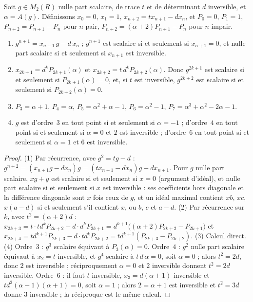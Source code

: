 \begin{enonce}
Soit $g \in M_2(R)$ nulle part scalaire, de trace $t$ et de déterminant $d$ inversible, et $\alpha = A(g)$. Définissons $x_0 = 0$, $x_1 = 1$, $x_{n+2} = t x_{n+1} - d x_n$, et $P_0 = 0$, $P_1 = 1$, $P_{n+2} = P_{n+1} - P_n$ pour $n$ pair, $P_{n+2} = (\alpha + 2)P_{n+1} - P_n$ pour $n$ impair.
\begin{enumerate}
\item $g^{n+1} = x_{n+1}\,g - d\,x_n$ ; $g^{n+1}$ est scalaire si et seulement si $x_{n+1} = 0$, et nulle part scalaire si et seulement si $x_{n+1}$ est inversible.
\item $x_{2k+1} = d^k P_{2k+1}(\alpha)$ et $x_{2k+2} = t\,d^k P_{2k+2}(\alpha)$. Donc $g^{2k+1}$ est scalaire si et seulement si $P_{2k+1}(\alpha) = 0$, et, si $t$ est inversible, $g^{2k+2}$ est scalaire si et seulement si $P_{2k+2}(\alpha) = 0$.
\item $P_3 = \alpha + 1$, $P_4 = \alpha$, $P_5 = \alpha^2 + \alpha - 1$, $P_6 = \alpha^2 - 1$, $P_7 = \alpha^3 + \alpha^2 - 2\alpha - 1$.
\item $g$ est d'ordre~$3$ en tout point si et seulement si $\alpha = -1$ ; d'ordre~$4$ en tout point si et seulement si $\alpha = 0$ et $2$ est inversible ; d'ordre~$6$ en tout point si et seulement si $\alpha = 1$ et $6$ est inversible.
\end{enumerate}
\end{enonce}

\begin{proof}
(1) Par récurrence, avec $g^2 = tg - d$ : $g^{n+2} = (x_{n+1}g - dx_n)g = (tx_{n+1} - dx_n)g - dx_{n+1}$. Pour $g$ nulle part scalaire, $xg + y$ est scalaire si et seulement si $x = 0$ (argument d'idéal), et nulle part scalaire si et seulement si $x$ est inversible : ses coefficients hors diagonale et la différence diagonale sont $x$ fois ceux de $g$, et un idéal maximal contient $xb$, $xc$, $x(a-d)$ si et seulement s'il contient $x$, ou $b$, $c$ et $a - d$. (2) Par récurrence sur $k$, avec $t^2 = (\alpha + 2)d$ : $x_{2k+3} = t\cdot t d^k P_{2k+2} - d\cdot d^k P_{2k+1} = d^{k+1}\big((\alpha+2)P_{2k+2} - P_{2k+1}\big)$ et $x_{2k+4} = t d^{k+1}P_{2k+3} - d\cdot t d^k P_{2k+2} = t d^{k+1}(P_{2k+3} - P_{2k+2})$. (3) Calcul direct. (4) Ordre~$3$ : $g^3$ scalaire équivaut à $P_3(\alpha) = 0$. Ordre~$4$ : $g^2$ nulle part scalaire équivaut à $x_2 = t$ inversible, et $g^4$ scalaire à $t\,d\,\alpha = 0$, soit $\alpha = 0$ ; alors $t^2 = 2d$, donc $2$ est inversible ; réciproquement $\alpha = 0$ et $2$ inversible donnent $t^2 = 2d$ inversible. Ordre~$6$ : il faut $t$ inversible, $x_3 = d(\alpha + 1)$ inversible et $t d^2(\alpha - 1)(\alpha + 1) = 0$, soit $\alpha = 1$ ; alors $2 = \alpha + 1$ est inversible et $t^2 = 3d$ donne $3$ inversible ; la réciproque est le même calcul.
\end{proof}

